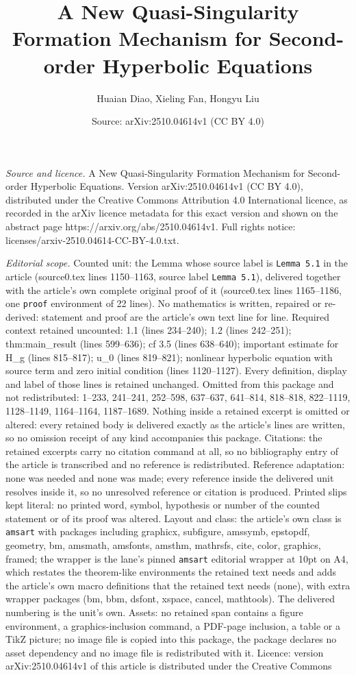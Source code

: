 \documentclass[10pt,a4paper]{amsart}
\title[A New Quasi-Singularity Formation Mechanism for Second-order]{A New Quasi-Singularity Formation Mechanism for Second-order Hyperbolic Equations}
\author{Huaian Diao, Xieling Fan, Hongyu Liu}
\date{Source: arXiv:2510.04614v1 (CC BY 4.0)}
\begin{document}
\maketitle

\noindent\emph{Source and licence.} A New Quasi-Singularity Formation Mechanism for Second-order Hyperbolic Equations. Version arXiv:2510.04614v1 (CC BY 4.0), distributed under the Creative Commons Attribution 4.0 International licence, as recorded in the arXiv licence metadata for this exact version and shown on the abstract page https://arxiv.org/abs/2510.04614v1. Full rights notice: licenses/arxiv-2510.04614-CC-BY-4.0.txt.\par\smallskip

\noindent\textit{Editorial scope.} Counted unit: the Lemma whose source label is \texttt{Lemma 5.1} in the article (source0.tex lines 1150--1163, source label \texttt{Lemma 5.1}), delivered together with the article's own complete original proof of it (source0.tex lines 1165--1186, one \texttt{proof} environment of 22 lines). No mathematics is written, repaired or re-derived: statement and proof are the article's own text line for line. Required context retained uncounted: 1.1 (lines 234--240); 1.2 (lines 242--251); thm:main\_result (lines 599--636); cf 3.5 (lines 638--640); important estimate for H\_g (lines 815--817); u\_0 (lines 819--821); nonlinear hyperbolic equation with source term and zero initial condition (lines 1120--1127). Every definition, display and label of those lines is retained unchanged. Omitted from this package and not redistributed: 1--233, 241--241, 252--598, 637--637, 641--814, 818--818, 822--1119, 1128--1149, 1164--1164, 1187--1689. Nothing inside a retained excerpt is omitted or altered: every retained body is delivered exactly as the article's lines are written, so no omission receipt of any kind accompanies this package. Citations: the retained excerpts carry no citation command at all, so no bibliography entry of the article is transcribed and no reference is redistributed. Reference adaptation: none was needed and none was made; every reference inside the delivered unit resolves inside it, so no unresolved reference or citation is produced. Printed slips kept literal: no printed word, symbol, hypothesis or number of the counted statement or of its proof was altered. Layout and class: the article's own class is \texttt{amsart} with packages including graphicx, subfigure, amssymb, epstopdf, geometry, bm, amsmath, amsfonts, amsthm, mathrsfs, cite, color, graphics, framed; the wrapper is the lane's pinned \texttt{amsart} editorial wrapper at 10pt on A4, which restates the theorem-like environments the retained text needs and adds the article's own macro definitions that the retained text needs (none), with extra wrapper packages (bm, bbm, dsfont, xspace, cancel, mathtools). The delivered numbering is the unit's own. Assets: no retained span contains a figure environment, a graphics-inclusion command, a PDF-page inclusion, a table or a TikZ picture; no image file is copied into this package, the package declares no asset dependency and no image file is redistributed with it. Licence: version arXiv:2510.04614v1 of this article is distributed under the Creative Commons 
\end{document}
